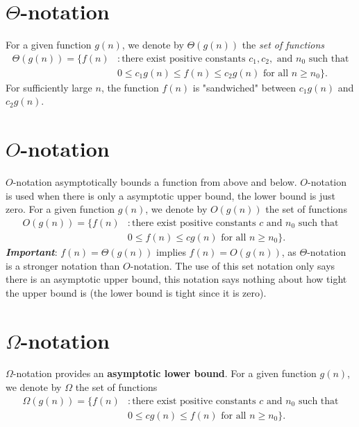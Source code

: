 \documentclass{article}
\begin{document}
\newpage
\section*{$\Theta$-notation}
For a given function $g(n)$, we denote by $\Theta{(g(n))}$ the \textit{set of functions}\newline
\begin{equation*}
\begin{split}
\Theta{(g(n))} = \{f(n) & : \text{there exist positive constants } c_1, c_2, \text{ and } n_0 \text{ such that}\\
  & 0 \leq c_1g(n) \leq f(n) \leq c_2g(n) \text{ for all } n \geq n_0\}.
\end{split}
\end{equation*}
For sufficiently large $n$, the function $f(n)$ is "sandwiched" between $c_1g(n)$ and $c_2g(n)$.


\section*{$O$-notation}
$O$-notation asymptotically bounds a function from above and below. $O$-notation is used when there is only a asymptotic upper bound, the lower bound is just zero. \newline
For a given function $g(n)$, we denote by $O{(g(n))}$ the set of functions\newline
\begin{equation*}
\begin{split}
O{(g(n))} = \{f(n) & : \text{there exist positive constants } c\text{ and } n_0 \text{ such that}\\
  & 0 \leq f(n) \leq cg(n) \text{ for all } n \geq n_0\}.
\end{split}
\end{equation*}
\textbf{\emph{Important}}: $f(n)=\Theta{(g(n))}$ implies $f(n)=O{(g(n))}$, as $\Theta$-notation is a stronger notation than $O$-notation. The use of this set notation only says there is an asymptotic upper bound, this notation says nothing about how tight the upper bound is (the lower bound is tight since it is zero).


\section*{$\Omega$-notation}
$\Omega$-notation provides an \textbf{asymptotic lower bound}.\newline
For a given function $g(n)$, we denote by $\Omega$ the set of functions\newline
\begin{equation*}
\begin{split}
\Omega{(g(n))} = \{f(n) & : \text{there exist positive constants } c\text{ and } n_0 \text{ such that}\\
  & 0 \leq cg(n) \leq f(n) \text{ for all } n \geq n_0\}.
\end{split}
\end{equation*}
\end{document}
